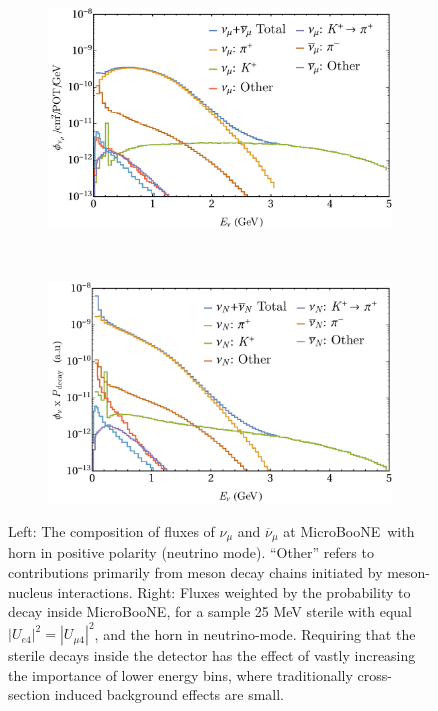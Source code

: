\documentclass[11pt, a4paper]{article}
\def\muboone{MicroBooNE}
\begin{document}
\begin{figure}[t]
\center
\begin{subfigure}[t]{0.5\textwidth}
\includegraphics[width=\textwidth]{figures/microBooNE_flux.pdf} 
\end{subfigure}%
~
\begin{subfigure}[t]{0.5\textwidth}
\includegraphics[width=\textwidth]{figures/microBooNE_flux_weighted.pdf}
\end{subfigure}

\caption{\label{fig:flux_plots} Left: The composition of fluxes of $\nu_\mu$
and $\overline{\nu}_\mu$ at \muboone\ with horn in positive polarity (neutrino
mode). ``Other'' refers to contributions primarily from meson decay chains
initiated by meson-nucleus interactions. Right: Fluxes weighted by the
probability to decay inside \muboone, for a sample 25 MeV sterile with equal
$|U_{e4}|^2 = |U_{\mu 4}|^2$, and the horn in neutrino-mode. Requiring that the
sterile decays inside the detector has the effect of vastly increasing the importance of lower
energy bins, where traditionally cross-section induced background effects are
small.}

\end{figure}
\end{document}

